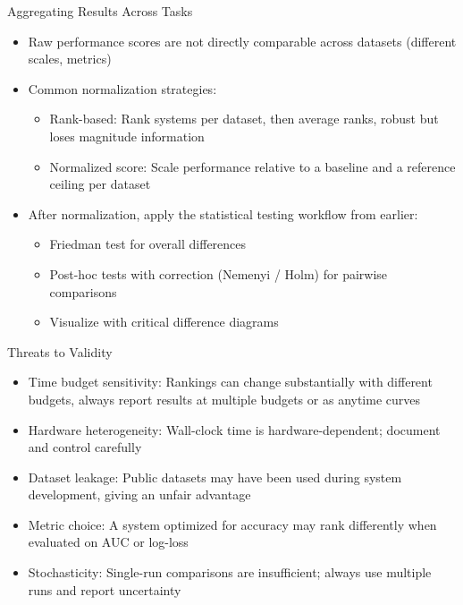 \documentclass[main]{subfiles}
\begin{document}
\begin{frame}{Aggregating Results Across Tasks}
    \begin{itemize}
        \item Raw performance scores are not directly comparable across datasets (different scales, metrics)
        \item Common normalization strategies:
        \begin{itemize}
            \item Rank-based: Rank systems per dataset, then average ranks, robust but loses magnitude information
            \item Normalized score: Scale performance relative to a baseline and a reference ceiling per dataset
        \end{itemize}
        \item After normalization, apply the statistical testing workflow from earlier:
        \begin{itemize}
            \item Friedman test for overall differences
            \item Post-hoc tests with correction (Nemenyi / Holm) for pairwise comparisons
            \item Visualize with critical difference diagrams
        \end{itemize}
    \end{itemize}
\end{frame}

\begin{frame}{Threats to Validity}
    \begin{itemize}
        \item Time budget sensitivity: Rankings can change substantially with different budgets, always report results at multiple budgets or as anytime curves
        \item Hardware heterogeneity: Wall-clock time is hardware-dependent; document and control carefully
        \item Dataset leakage: Public datasets may have been used during system development, giving an unfair advantage
        \item Metric choice: A system optimized for accuracy may rank differently when evaluated on AUC or log-loss
        \item Stochasticity: Single-run comparisons are insufficient; always use multiple runs and report uncertainty
    \end{itemize}
\end{frame}
\end{document}
